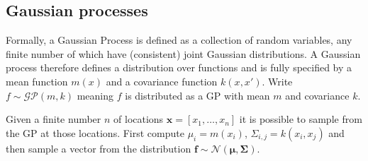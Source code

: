 \documentclass{article}
\begin{document}
\subsection{Gaussian processes}
Formally, a Gaussian Process is defined as a collection of random variables, any finite number of which have (consistent) joint Gaussian distributions. A Gaussian process therefore defines a distribution over functions and is fully specified by a mean function $m(x)$ and a covariance function $k(x, x')$. Write $f \sim \mathcal{GP}(m, k)$ meaning $f$ is distributed as a GP with mean $m$ and covariance $k$.

Given a finite number $n$ of locations $\mathbf{x} = [x_1, \dots, x_n]$ it is possible to sample from the GP at those locations. First compute $\mu_i = m(x_i)$, $\Sigma_{i,j} = k(x_i, x_j)$ and then sample a vector from the distribution $\mathbf{f} \sim \mathcal{N}(\bm{\mu}, \mathbf{\Sigma})$.
\end{document}
